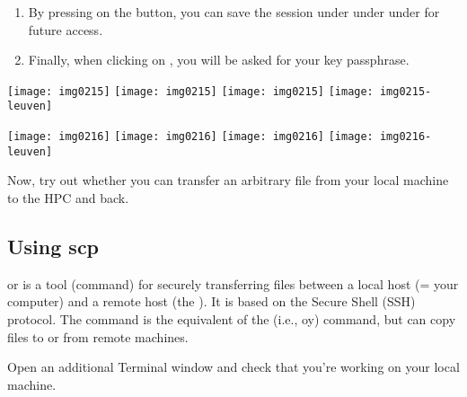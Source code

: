   \begin{enumerate}
  \item  By pressing on the  button, you can save the session
\ifantwerpen
       under 
\fi
\ifgent
       under 
\fi
\ifbrussel
       under 
\fi
for future access.
  \item  Finally, when clicking on , you will be asked for your key passphrase.
  \end{enumerate}

  \begin{center}
\ifantwerpen
  \texttt{[image: img0215]}
\fi
\ifbrussel
  \texttt{[image: img0215]}
\fi
\ifgent
  \texttt{[image: img0215]}
\fi
\ifleuven
  \texttt{[image: img0215-leuven]}
\fi
  \end{center}
  \firsttimeconnection

  \begin{center}
\ifantwerpen
  \texttt{[image: img0216]}
\fi
\ifbrussel
  \texttt{[image: img0216]}
\fi
\ifgent
  \texttt{[image: img0216]}
\fi
\ifleuven
  \texttt{[image: img0216-leuven]}
\fi
  \end{center}

  Now, try out whether you can transfer an arbitrary file from your local
  machine to the HPC and back.

\fi

\ifmacORlinux
  \subsection{Using scp}

   or  is a tool (command) for securely
  transferring files between a local host (= your computer) and a remote host
  (the \hpc). It is based on the Secure Shell (SSH) protocol.  The 
  command is the equivalent of the   (i.e., oy)
  command, but can copy files to or from remote machines.

  Open an additional Terminal window and check that you're working on your local
  machine.

